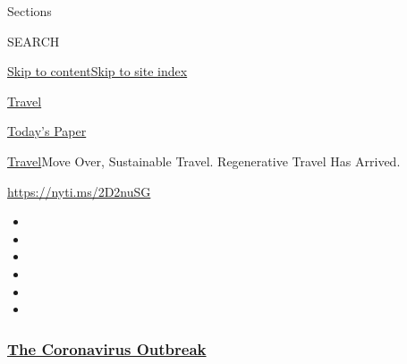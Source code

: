 Sections

SEARCH

\protect\hyperlink{site-content}{Skip to
content}\protect\hyperlink{site-index}{Skip to site index}

\href{https://www.nytimes3xbfgragh.onion/section/travel}{Travel}

\href{https://myaccount.nytimes3xbfgragh.onion/auth/login?response_type=cookie\&client_id=vi}{}

\href{https://www.nytimes3xbfgragh.onion/section/todayspaper}{Today's
Paper}

\href{/section/travel}{Travel}\textbar{}Move Over, Sustainable Travel.
Regenerative Travel Has Arrived.

\url{https://nyti.ms/2D2nuSG}

\begin{itemize}
\item
\item
\item
\item
\item
\item
\end{itemize}

\hypertarget{the-coronavirus-outbreak}{%
\subsubsection{\texorpdfstring{\href{https://www.nytimes3xbfgragh.onion/news-event/coronavirus?name=styln-coronavirus-national\&region=TOP_BANNER\&block=storyline_menu_recirc\&action=click\&pgtype=Article\&impression_id=4ffd9730-f1b7-11ea-920e-9d20be26e6a7\&variant=undefined}{The
Coronavirus
Outbreak}}{The Coronavirus Outbreak}}\label{the-coronavirus-outbreak}}

